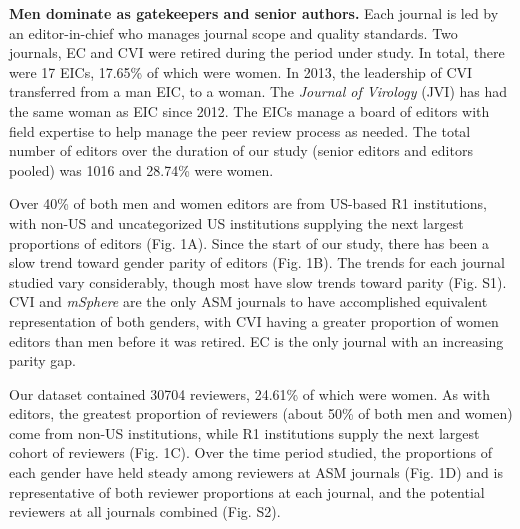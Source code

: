 \documentclass[11pt,]{article}
\begin{document}
\textbf{Men dominate as gatekeepers and senior authors.} Each journal is
led by an editor-in-chief who manages journal scope and quality
standards. Two journals, EC and CVI were retired during the period under
study. In total, there were 17 EICs, 17.65\% of which were women. In
2013, the leadership of CVI transferred from a man EIC, to a woman. The
\emph{Journal of Virology} (JVI) has had the same woman as EIC since
2012. The EICs manage a board of editors with field expertise to help
manage the peer review process as needed. The total number of editors
over the duration of our study (senior editors and editors pooled) was
1016 and 28.74\% were women.

Over 40\% of both men and women editors are from US-based R1
institutions, with non-US and uncategorized US institutions supplying
the next largest proportions of editors (Fig. 1A). Since the start of
our study, there has been a slow trend toward gender parity of editors
(Fig. 1B). The trends for each journal studied vary considerably, though
most have slow trends toward parity (Fig. S1). CVI and \emph{mSphere}
are the only ASM journals to have accomplished equivalent representation
of both genders, with CVI having a greater proportion of women editors
than men before it was retired. EC is the only journal with an
increasing parity gap.

Our dataset contained 30704 reviewers, 24.61\% of which were women. As
with editors, the greatest proportion of reviewers (about 50\% of both
men and women) come from non-US institutions, while R1 institutions
supply the next largest cohort of reviewers (Fig. 1C). Over the time
period studied, the proportions of each gender have held steady among
reviewers at ASM journals (Fig. 1D) and is representative of both
reviewer proportions at each journal, and the potential reviewers at all
journals combined (Fig. S2).
\end{document}
